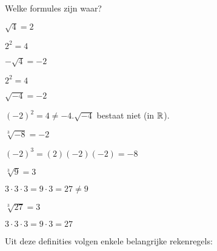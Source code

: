 \documentclass{ximera}
\begin{document}
\begin{exercise} Welke formules zijn waar?

    \begin{xmmulticols}[3]
    \begin{question} 
        \choiceTrue $\sqrt{4} = 2$
        \begin{feedback} $2 ^2 = 4$ \end{feedback}
    \end{question}
    \begin{question} 
        \choiceTrue $-\sqrt{4} = -2$
        \begin{feedback} $2 ^2 = 4$ \end{feedback}
    \end{question}
    \begin{question} 
        \choiceFalse $\sqrt{-4} = -2$
        \begin{feedback} $(-2)^2 = 4 \neq -4. \sqrt{-4}$ bestaat niet (in $\mathbb{R}$). \end{feedback}
    \end{question}
    \begin{question} 
        \choiceTrue $\sqrt[3]{-8} = -2$
        \begin{feedback} $(-2)^3 = (2)(-2)(-2) = -8$ \end{feedback}
    \end{question}
    \begin{question} 
        \choiceFalse $\sqrt[3]{9} = 3$
        \begin{feedback} $3\cdot3\cdot3 = 9\cdot3 = 27 \neq 9$ \end{feedback}
    \end{question}
    \begin{question} 
        \choiceFalse $\sqrt[3]{27} = 3$
        \begin{feedback} $3\cdot3\cdot3 = 9\cdot3 = 27$ \end{feedback}
    \end{question}

\end{xmmulticols}

\end{exercise}


Uit deze definities volgen enkele belangrijke rekenregels: 
\end{document}
